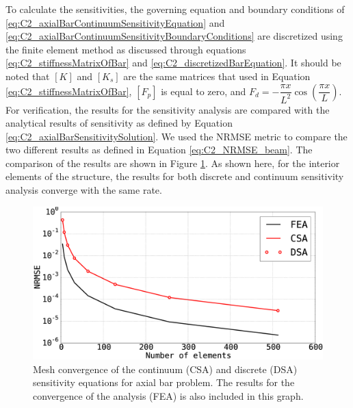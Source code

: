To calculate the sensitivities, the governing equation and boundary conditions of \eqref{eq:C2_axialBarContinuumSensitivityEquation} and \eqref{eq:C2_axialBarContinuumSensitivityBoundaryConditions} are discretized using the finite element method as discussed through equations \eqref{eq:C2_stiffnessMatrixOfBar} and \eqref{eq:C2_discretizedBarEquation}. It should be noted that $[K]$ and $[K_s]$ are the same matrices that used in Equation \eqref{eq:C2_stiffnessMatrixOfBar}, $[F_p]$ is equal to zero, and $F_d = -\dfrac{\pi x}{L^2} \cos \left( \dfrac{\pi x}{L} \right)$. For verification, the results for the sensitivity analysis are compared with the analytical results of sensitivity as defined by Equation \eqref{eq:C2_axialBarSensitivitySolution}. We used the NRMSE metric to compare the two different results as defined in Equation \eqref{eq:C2_NRMSE_beam}. The comparison of the results are shown in Figure \ref{fig:C2_continuumSensitivityResults}. As shown here, for the interior elements of the structure, the results for both discrete and continuum sensitivity analysis converge with the same rate.
%
\begin{figure}[h]
    \centering
    \includegraphics[width=14.00cm]{Chapter_2/figure/axial_bar_continuum_sensitivity_analysis.eps}
    \caption{Mesh convergence of the continuum (CSA) and discrete (DSA) sensitivity equations for axial bar problem. The results for the convergence of the analysis (FEA) is also included in this graph.}
    \label{fig:C2_continuumSensitivityResults}
\end{figure}
%